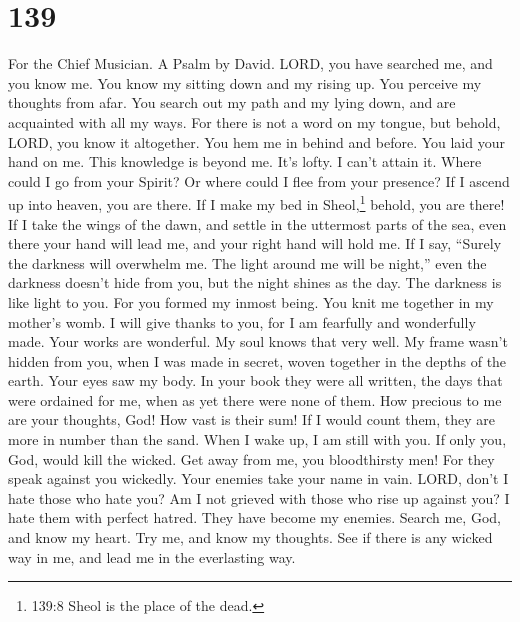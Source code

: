 \hypertarget{section-131}{%
\section{139}\label{section-131}}

For the Chief Musician. A Psalm by David.  LORD, you have
searched me, and you know me.  You know my sitting down and
my rising up. You perceive my thoughts from afar.  You
search out my path and my lying down, and are acquainted with all my
ways.  For there is not a word on my tongue, but behold,
LORD, you know it altogether.  You hem me in behind and
before. You laid your hand on me.  This knowledge is beyond
me. It's lofty. I can't attain it.  Where could I go from
your Spirit? Or where could I flee from your presence?  If I
ascend up into heaven, you are there. If I make my bed in
Sheol,\footnote{139:8 Sheol is the place of the dead.} behold, you are
there!  If I take the wings of the dawn, and settle in the
uttermost parts of the sea,  even there your hand will lead
me, and your right hand will hold me.  If I say, ``Surely
the darkness will overwhelm me. The light around me will be night,''
 even the darkness doesn't hide from you, but the night
shines as the day. The darkness is like light to you.  For
you formed my inmost being. You knit me together in my mother's womb.
 I will give thanks to you, for I am fearfully and
wonderfully made. Your works are wonderful. My soul knows that very
well.  My frame wasn't hidden from you, when I was made in
secret, woven together in the depths of the earth.  Your
eyes saw my body. In your book they were all written, the days that were
ordained for me, when as yet there were none of them.  How
precious to me are your thoughts, God! How vast is their sum!
 If I would count them, they are more in number than the
sand. When I wake up, I am still with you.  If only you,
God, would kill the wicked. Get away from me, you bloodthirsty men!
 For they speak against you wickedly. Your enemies take
your name in vain.  LORD, don't I hate those who hate you?
Am I not grieved with those who rise up against you?  I
hate them with perfect hatred. They have become my enemies.
 Search me, God, and know my heart. Try me, and know my
thoughts.  See if there is any wicked way in me, and lead
me in the everlasting way.

